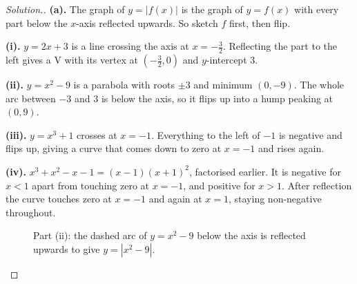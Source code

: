 \documentclass[11pt,a4paper]{article}
\theoremstyle{definition}
\newenvironment{solution}
  {\renewcommand{\qedsymbol}{}\begin{proof}[\textit{Solution}.]}
  {\end{proof}}
\begin{document}
\begin{solution}
\textbf{(a).} The graph of $y=|f(x)|$ is the graph of $y=f(x)$ with every part below the
$x$-axis reflected upwards. So sketch $f$ first, then flip.

\textbf{(i).} $y=2x+3$ is a line crossing the axis at $x=-\frac{3}{2}$. Reflecting the
part to the left gives a V with its vertex at $\left(-\frac{3}{2},0\right)$ and
$y$-intercept $3$.

\textbf{(ii).} $y=x^2-9$ is a parabola with roots $\pm 3$ and minimum $(0,-9)$. The
whole arc between $-3$ and $3$ is below the axis, so it flips up into a hump peaking at
$(0,9)$.

\textbf{(iii).} $y=x^3+1$ crosses at $x=-1$. Everything to the left of $-1$ is negative
and flips up, giving a curve that comes down to zero at $x=-1$ and rises again.

\textbf{(iv).} $x^3+x^2-x-1=(x-1)(x+1)^2$, factorised earlier. It is negative for $x<1$
apart from touching zero at $x=-1$, and positive for $x>1$. After reflection the curve
touches zero at $x=-1$ and again at $x=1$, staying non-negative throughout.

\begin{figure}[H]
\centering
{}
\caption{Part (ii): the dashed arc of $y=x^2-9$ below the axis is reflected upwards to give $y=\left|x^2-9\right|$.}
\end{figure}


\end{solution}
\end{document}
